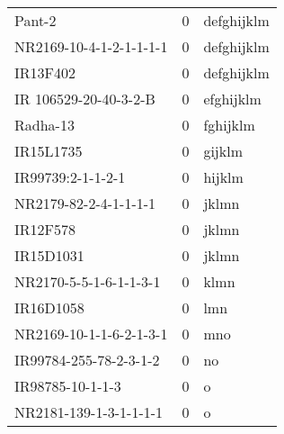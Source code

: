 \documentclass[]{article}
\begin{document}
\begin{longtable}{lll}
Pant-2 & 0 & defghijklm\\
\rowcolor{gray!6}  NR2169-10-4-1-2-1-1-1-1 & 0 & defghijklm\\
IR13F402 & 0 & defghijklm\\
\addlinespace
\rowcolor{gray!6}  IR 106529-20-40-3-2-B & 0 & efghijklm\\
Radha-13 & 0 & fghijklm\\
\rowcolor{gray!6}  IR15L1735 & 0 & gijklm\\
IR99739:2-1-1-2-1 & 0 & hijklm\\
\rowcolor{gray!6}  NR2179-82-2-4-1-1-1-1 & 0 & jklmn\\
\addlinespace
IR12F578 & 0 & jklmn\\
\rowcolor{gray!6}  IR15D1031 & 0 & jklmn\\
NR2170-5-5-1-6-1-1-3-1 & 0 & klmn\\
\rowcolor{gray!6}  IR16D1058 & 0 & lmn\\
NR2169-10-1-1-6-2-1-3-1 & 0 & mno\\
\addlinespace
\rowcolor{gray!6}  IR99784-255-78-2-3-1-2 & 0 & no\\
IR98785-10-1-1-3 & 0 & o\\
\rowcolor{gray!6}  NR2181-139-1-3-1-1-1-1 & 0 & o\\
\bottomrule
\end{longtable}
\endgroup{}
\begingroup\fontsize{12}{14}\selectfont
\end{document}
